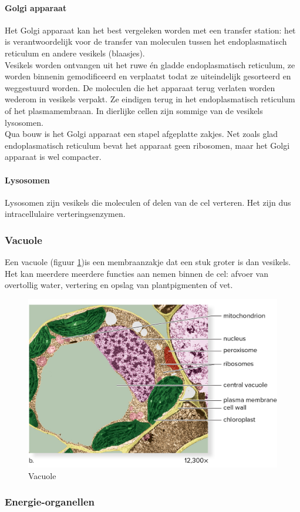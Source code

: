 \documentclass[a4paper,kul]{kulakarticle} %
\begin{document}
\paragraph{Golgi apparaat}
Het Golgi apparaat kan het best vergeleken worden met een transfer station: het is verantwoordelijk voor de transfer van moleculen tussen het endoplasmatisch reticulum en andere vesikels (blaasjes). \\
Vesikels worden ontvangen uit het ruwe én gladde endoplasmatisch reticulum, ze worden binnenin gemodificeerd en verplaatst todat ze uiteindelijk gesorteerd en weggestuurd worden. De moleculen die het apparaat terug verlaten worden wederom in vesikels verpakt. Ze eindigen terug in het endoplasmatisch reticulum of het plasmamembraan. In dierlijke cellen zijn sommige van de vesikels lysosomen.  \\
Qua bouw is het Golgi apparaat een stapel afgeplatte zakjes. Net zoals glad endoplasmatisch reticulum bevat het apparaat geen ribosomen, maar het Golgi apparaat is wel compacter.
\paragraph{Lysosomen}
Lysosomen zijn vesikels die moleculen of delen van de cel verteren. Het zijn dus intracellulaire verteringsenzymen.
\subsubsection{Vacuole}
Een vacuole (figuur \ref{fig:vacuole})is een membraanzakje dat een stuk groter is dan vesikels. Het kan meerdere meerdere functies aan nemen binnen de cel: afvoer van overtollig water, vertering en opslag van plantpigmenten of vet.
\begin{figure}[!h]
	\centering
	\includegraphics[width=0.5\linewidth]{Vacuole}
	\caption[Vacuole]{Vacuole}
	\label{fig:vacuole}
\end{figure}
\newpage
\subsubsection{Energie-organellen}
\end{document}
